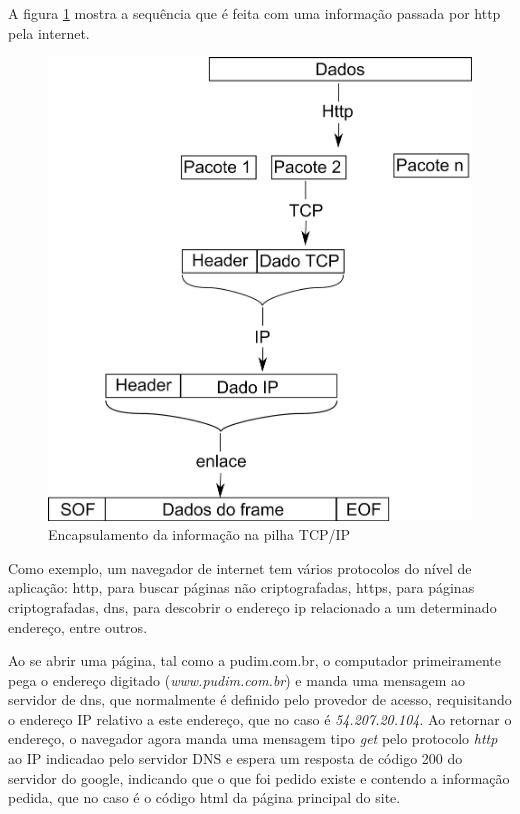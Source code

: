 	A figura \ref{fig:tcp-ip} mostra a sequência que é feita com uma informação passada por http pela internet.
	\begin{figure}[hbt]
		\begin{center}
			\includegraphics[width=\textwidth]{figuras/tcp-ip}
		\end{center}
		\caption{Encapsulamento da informação na pilha TCP/IP}
		\label{fig:tcp-ip}
	\end{figure}

Como exemplo, um navegador de internet tem vários protocolos do nível de aplicação: http, para buscar páginas não criptografadas, https, para páginas criptografadas, dns, para descobrir o endereço ip relacionado a um determinado endereço, entre outros.

Ao se abrir uma página, tal como a pudim.com.br, o computador primeiramente pega o endereço digitado (\emph{www.pudim.com.br}) e manda uma mensagem ao servidor de dns, que normalmente é definido pelo provedor de acesso, requisitando o endereço IP relativo a este endereço, que no caso é \emph{54.207.20.104}. Ao retornar o endereço, o navegador agora manda uma mensagem tipo \emph{get} pelo protocolo \emph{http} ao IP indicadao pelo servidor DNS e espera um resposta de código 200 do servidor do google, indicando que o que foi pedido existe e contendo a informação pedida, que no caso é o código html da página principal do site.

